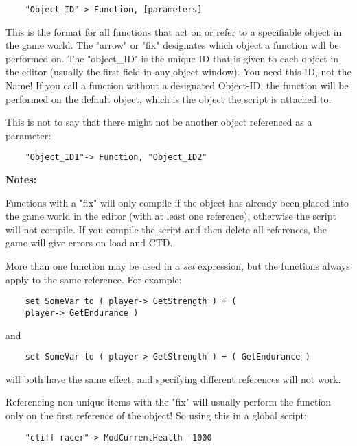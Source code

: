 \begin{lstlisting}
	"Object_ID"-> Function, [parameters]
\end{lstlisting}

This is the format for all functions that act on or refer to a
specifiable object in the game world. The "arrow" or "fix" designates
which object a function will be performed on. The "object\_ID" is the
unique ID that is given to each object in the editor (usually the first
field in any object window). You need this ID, not the Name! If you call
a function without a designated Object-ID, the function will be
performed on the default object, which is the object the script is
attached to.

This is not to say that there might not be another object referenced as
a parameter:

\begin{lstlisting}
	"Object_ID1"-> Function, "Object_ID2"
\end{lstlisting}

\textbf{Notes:}

Functions with a "fix" will only compile if the object has already been
placed into the game world in the editor (with at least one reference),
otherwise the script will not compile. If you compile the script and
then delete all references, the game will give errors on load and CTD.

More than one function may be used in a \emph{set} expression, but the
functions always apply to the same reference. For example:

\begin{lstlisting}
	set SomeVar to ( player-> GetStrength ) + (
	player-> GetEndurance )
\end{lstlisting}

and

\begin{lstlisting}
	set SomeVar to ( player-> GetStrength ) + ( GetEndurance )
\end{lstlisting}

will both have the same effect, and specifying different references will
not work.

Referencing non-unique items with the "fix" will usually perform the
function only on the first reference of the object! So using this in a
global script:

\begin{lstlisting}
	"cliff racer"-> ModCurrentHealth -1000
\end{lstlisting}

